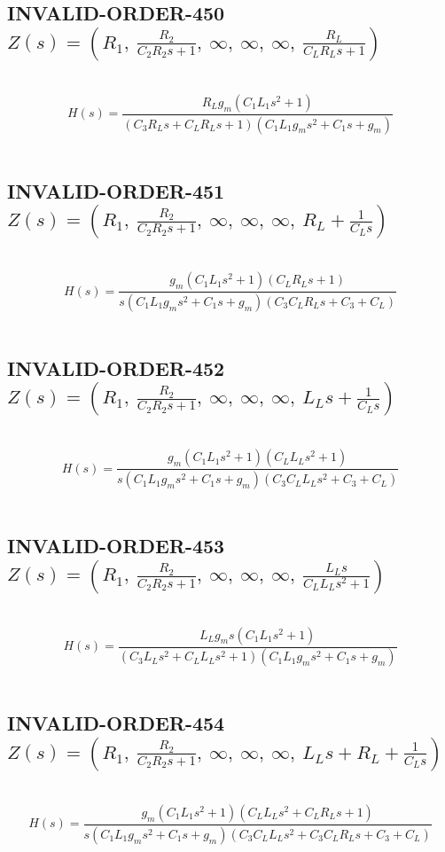\documentclass{article}
\begin{document}
\subsection{INVALID-ORDER-450 $Z(s) = \left( R_{1}, \  \frac{R_{2}}{C_{2} R_{2} s + 1}, \  \infty, \  \infty, \  \infty, \  \frac{R_{L}}{C_{L} R_{L} s + 1}\right)$ } \ 
\textbf{\[H(s) = \frac{R_{L} g_{m} \left(C_{1} L_{1} s^{2} + 1\right)}{\left(C_{3} R_{L} s + C_{L} R_{L} s + 1\right) \left(C_{1} L_{1} g_{m} s^{2} + C_{1} s + g_{m}\right)}\] } \ 
\subsection{INVALID-ORDER-451 $Z(s) = \left( R_{1}, \  \frac{R_{2}}{C_{2} R_{2} s + 1}, \  \infty, \  \infty, \  \infty, \  R_{L} + \frac{1}{C_{L} s}\right)$ } \ 
\textbf{\[H(s) = \frac{g_{m} \left(C_{1} L_{1} s^{2} + 1\right) \left(C_{L} R_{L} s + 1\right)}{s \left(C_{1} L_{1} g_{m} s^{2} + C_{1} s + g_{m}\right) \left(C_{3} C_{L} R_{L} s + C_{3} + C_{L}\right)}\] } \ 
\subsection{INVALID-ORDER-452 $Z(s) = \left( R_{1}, \  \frac{R_{2}}{C_{2} R_{2} s + 1}, \  \infty, \  \infty, \  \infty, \  L_{L} s + \frac{1}{C_{L} s}\right)$ } \ 
\textbf{\[H(s) = \frac{g_{m} \left(C_{1} L_{1} s^{2} + 1\right) \left(C_{L} L_{L} s^{2} + 1\right)}{s \left(C_{1} L_{1} g_{m} s^{2} + C_{1} s + g_{m}\right) \left(C_{3} C_{L} L_{L} s^{2} + C_{3} + C_{L}\right)}\] } \ 
\subsection{INVALID-ORDER-453 $Z(s) = \left( R_{1}, \  \frac{R_{2}}{C_{2} R_{2} s + 1}, \  \infty, \  \infty, \  \infty, \  \frac{L_{L} s}{C_{L} L_{L} s^{2} + 1}\right)$ } \ 
\textbf{\[H(s) = \frac{L_{L} g_{m} s \left(C_{1} L_{1} s^{2} + 1\right)}{\left(C_{3} L_{L} s^{2} + C_{L} L_{L} s^{2} + 1\right) \left(C_{1} L_{1} g_{m} s^{2} + C_{1} s + g_{m}\right)}\] } \ 
\subsection{INVALID-ORDER-454 $Z(s) = \left( R_{1}, \  \frac{R_{2}}{C_{2} R_{2} s + 1}, \  \infty, \  \infty, \  \infty, \  L_{L} s + R_{L} + \frac{1}{C_{L} s}\right)$ } \ 
\textbf{\[H(s) = \frac{g_{m} \left(C_{1} L_{1} s^{2} + 1\right) \left(C_{L} L_{L} s^{2} + C_{L} R_{L} s + 1\right)}{s \left(C_{1} L_{1} g_{m} s^{2} + C_{1} s + g_{m}\right) \left(C_{3} C_{L} L_{L} s^{2} + C_{3} C_{L} R_{L} s + C_{3} + C_{L}\right)}\] } \ 
\end{document}
